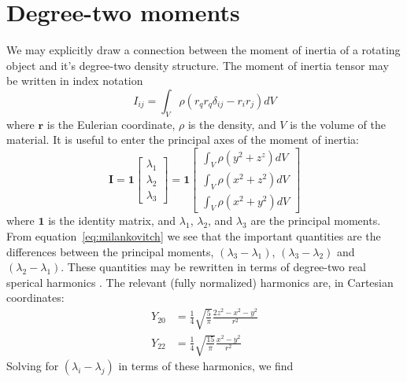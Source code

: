 \documentclass[extra,mreferee]{gji}
\newif\ifdetail
\begin{document}




\appendix

\section{Degree-two moments}
\label{appendix:moments}

We may explicitly draw a connection between the moment of inertia of a rotating object and it's degree-two density structure.  The moment of inertia tensor may be written in index notation
\begin{equation}
I_{ij} = \int_V \rho \left( r_q r_q \delta_{ij} - r_i r_j \right) dV
\label{eq:inertia}
\end{equation}
where $\mathbf{r}$ is the Eulerian coordinate, $\rho$ is the density, and $V$ is the volume of the material.  
It is useful to enter the principal axes of the moment of inertia:
\begin{equation}
\mathbf{I} = \mathbf{1} \begin{bmatrix}
\lambda_1 \\ \lambda_2 \\ \lambda_3
\end{bmatrix} = 
\mathbf{1} \begin{bmatrix}
\int_V \rho (y^2+z^z) dV\\
\int_V \rho (x^2+z^2) dV\\
\int_V \rho (x^2+y^2) dV
\end{bmatrix}
\end{equation}
where $\mathbf{1}$ is the identity matrix, and $\lambda_1$, $\lambda_2$, and $\lambda_3$ are the principal moments.
From equation~\eqref{eq:milankovitch} we see that the important quantities are the differences between the 
principal moments, $(\lambda_3-\lambda_1)$, $(\lambda_3-\lambda_2)$ and $(\lambda_2-\lambda_1)$.
These quantities may be rewritten in terms of degree-two real sperical harmonics \citep[e.g.][]{dahlen1999theoretical}.
The relevant (fully normalized) harmonics are, in Cartesian coordinates:
\begin{equation}
\begin{aligned}
Y_{20} &= \frac{1}{4} \sqrt{\frac{ 5}{\pi}} \frac{ 2 z^2 - x^2 - y^2}{r^2} \\ 
Y_{22} &= \frac{1}{4} \sqrt{\frac{15}{\pi}} \frac{ x^2 - y^2}{r^2}
\end{aligned}
\end{equation}
Solving for $( \lambda_i - \lambda_j )$ in terms of these harmonics, we find
\ifdetail
\end{document}
